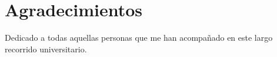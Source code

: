\documentclass[12pt,twoside,titlepage]{report}
\newcommand{\nombreautor}{Jorge Contreras Padilla}
\newcommand{\nombretutor}{Francisco Gortázar Bellas\\Michel Maes Bermejo}
\newcommand{\titulotrabajo}{Estudio de sistemas de integración continua en proyectos GitHub y GitLab}
\newcommand{\escuelalargo}{Escuela Técnica Superior de Ingeniería Informática}
\newcommand{\universidad}{Universidad Rey Juan Carlos}
\newcommand{\fecha}{01/02/2022}
\newcommand\blankpage{%
    \newpage
    \null
    \thispagestyle{empty}%
    \newpage}
\begin{document}








\hypersetup{pageanchor=true}

\normalsize
\afterpage{\blankpage} %






\setlength{\parskip}{0.75em}
\renewcommand{\baselinestretch}{1.25}

\setcounter{page}{2}



\chapter*{Agradecimientos}

Dedicado a todas aquellas personas que me han acompañado en este largo recorrido universitario.
\end{document}
